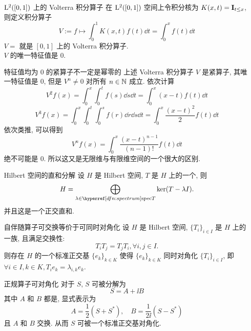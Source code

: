         \begin{ins}
            {\(\Lp[2]([0,1])\) 上的 Volterra 积分算子}
            在 \(\Lp[2]([0,1])\) 空间上令积分核为 \(K(x,t)=\operatorname{\mathbf{I}}_{t\leq x}\), 则定义积分算子
            \[V:=f\mapsto\int_0^1K(x,t)f(t)\dd{t}=\int_0^xf(t)\dd{t} \]
            \(V=\) 就是 \([0,1]\) 上的 Volterra 积分算子. \\
            \(V\) 的唯一特征值是 \(0\).
        \end{ins}

        \begin{cxmp}
            {特征值均为 0 的紧算子不一定是幂零的}
            上述 Volterra 积分算子 \(V\) 是紧算子, 其唯一特征值是 \(0\), 但是 \(V^n\neq 0\) 对所有 \(n\in\operatorname{\mathbb{N}}\) 成立. 依次计算
            \[V^2 f(x)=\int_0^x\int_0^t f(s)\dd{s}\dd{t}=\int_0^x(x-t)f(t)\dd{t}\]
            \[V^3 f(x)=\int_0^x\int_0^t\int_0^s f(r)\dd{r}\dd{s}\dd{t}=\int_0^x\frac{(x-t)^2}{2}f(t)\dd{t}\]
            依次类推, 可以得到
            \[V^n f(x)=\int_0^x\frac{(x-t)^{n-1}}{(n-1)!}f(t)\dd{t}\]
            绝不可能是 0. 所以这又是无限维与有限维空间的一个很大的区别.
        \end{cxmp}
        
        \begin{thm}
            {Hilbert 空间的直和分解}
            设 \(H\) 是 Hilbert 空间, \(T\) 是 \(H\) 上的一个\SelfAdjOp{}, 则
            \[H=\bigoplus_{\lambda\in\spec T}\ker (T-\lambda I).\]
            并且这是一个正交直和.
        \end{thm}

        \begin{thm}
            {自伴随算子可交换等价于可同时对角化}
            设 \(H\) 是 Hilbert 空间, \(\{T_i\}_{i\in I}\) 是 \(H\) 上的一族\SelfAdjOp{}, 且满足交换性:
            \[T_i T_j = T_j T_i, \forall i,j\in I.\]
            则存在 \(H\) 的一个标准正交基 \(\{e_k\}_{k\in K}\) 使得 \(\{e_k\}_{k\in K}\) 同时对角化 \(\{T_i\}_{i\in I}\), 即 \(\forall i\in I, k\in K, T_i e_k = \lambda_{i,k} e_k\).
        \end{thm}

        \begin{thm}
            {正规算子可对角化}
            对于\NormalOp{} \(S\), \(S\) 可被分解为
            \[S = A +\ii B\]
            其中 \(A\) 和 \(B\) 都是\SelfAdjOp{}, 显式表示为
            \[A = \frac{1}{2}(S + S^*), \quad B = \frac{1}{2\ii}(S - S^*)\]
            且 \(A\) 和 \(B\) 交换. 从而 \(S\) 可被一个标准正交基对角化.
        \end{thm}

